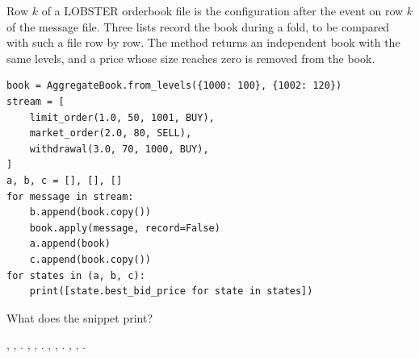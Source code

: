 \begin{question}
\label{question.recorderAlignedWithTheOrderbookFile}
Row $k$ of a LOBSTER orderbook file is the configuration
after the event on row $k$ of the message file.
Three lists record the book during a fold, to be compared with such a file row by row.
The method  returns an independent book with the same levels,
and a price whose size reaches zero is removed from the book.
\begin{lstlisting}[caption={Three records of one fold}, label=listing.recorderAlignedWithTheOrderbookFileRecords]
book = AggregateBook.from_levels({1000: 100}, {1002: 120})
stream = [
    limit_order(1.0, 50, 1001, BUY),
    market_order(2.0, 80, SELL),
    withdrawal(3.0, 70, 1000, BUY),
]
a, b, c = [], [], []
for message in stream:
    b.append(book.copy())
    book.apply(message, record=False)
    a.append(book)
    c.append(book.copy())
for states in (a, b, c):
    print([state.best_bid_price for state in states])
\end{lstlisting}
What does the snippet print?
\begin{choices}
 \choice \codehl{[1001, 1000, None]}, \codehl{[1000, 1001, 1000]}, \codehl{[1001, 1000, None]}.
 \correctchoice {}, \codehl{[1000, 1001, 1000]}, \codehl{[1001, 1000, None]}.
 \choice {}, \codehl{[1001, 1000, None]}, \codehl{[1001, 1000, None]}.
 \choice \codehl{[1000, 1000, 1000]}, \codehl{[1000, 1001, 1000]}, \codehl{[1001, 1000, 1000]}.
\end{choices}
\end{question}

